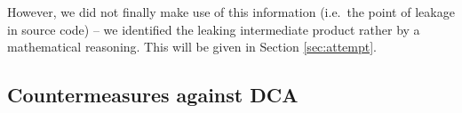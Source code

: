 However, we did not finally make use of this information (i.e.\ the point of leakage in source code) -- we identified the leaking intermediate product rather by a mathematical reasoning. This will be given in Section \ref{sec:attempt}.




\subsection{Countermeasures against DCA}

